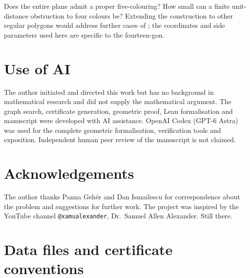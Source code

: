 \documentclass[11pt,a4paper]{article}
\theoremstyle{remark}
\newcommand{\code}[1]{\texttt{#1}}
\begin{document}
Does the entire plane admit a
proper five-colouring? How small can a finite unit-distance obstruction
to four colours be? Extending the construction to
other regular polygons would address further cases of
\cite[Problem~5.1]{efi}; the coordinates and side parameters used here
are specific to the fourteen-gon.

\section*{Use of AI}

The author initiated and directed this work but has no background
in mathematical research and did not supply the mathematical argument.
The graph search, certificate generation, geometric proof, Lean
formalisation and manuscript were developed with AI assistance.
OpenAI Codex (GPT-6 Astra) was used for the complete geometric
formalisation, verification tools and exposition.
Independent human peer review of the manuscript is not claimed.

\section*{Acknowledgements}

The author thanks Panna Geh\'er and Dan Ismailescu for correspondence
about the problem and suggestions for further work.
The project was inspired by the YouTube channel \code{@xamualexander},
Dr.~Samuel Allen Alexander. Still there.

\appendix
\section{Data files and certificate conventions}\label{app:data}
\end{document}
